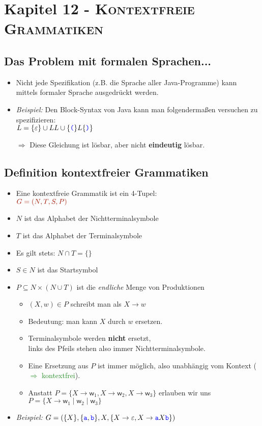 \documentclass{article}
\newcommand{\kapitel}[2]{Kapitel #1 - \textsc{#2}}
\newcommand{\blue}[1]{\textcolor{blue}{#1}}
\newcommand{\strongColor}[1]{\textcolor{strongColor}{#1}}
\newcommand{\strong}[1]{\textbf{\strongColor{#1}}}
\newcommand{\important}[1]{\textcolor{importantColor}{#1}}
\newcommand{\verweis}[1]{\textcolor{ForestGreen}{#1}}
\newcommand{\example}[1]{\textit{Beispiel: }#1}
\newcommand{\word}[1]{\blue{\texttt{#1}}}
\newcommand{\set}[1]{\{#1\}}
\newcommand{\w}{\textsf{w}}
\begin{document}
\newpage
\section{\kapitel{12}{Kontextfreie Grammatiken}}
\subsection{Das Problem mit formalen Sprachen...}
\begin{itemize}
    \item Nicht jede Spezifikation (z.B. die Sprache aller Java-Programme) kann mittels formaler Sprache ausgedrückt werden.
    \item \example{Den Block-Syntax von Java kann man folgendermaßen versuchen zu spezifizieren:\\$L=\set{\varepsilon}\cup LL\cup\set{\word{(}}L\set{\word{)}}$}
    \item[$\Rightarrow$]Diese Gleichung ist \important{lösbar}, aber nicht \important{\strong{eindeutig} lösbar}.
\end{itemize}

\subsection{Definition kontextfreier Grammatiken}
\begin{itemize}
    \item Eine kontextfreie Grammatik ist ein 4-Tupel:\\
    $\important{G=(N,T,S,P)}$
    \item \important{$N$} ist das Alphabet der \important{Nichtterminalsymbole}
    \item \important{$T$} ist das Alphabet der \important{Terminalsymbole}
    \item Es gilt stets: $N\cap T = \set{}$
    \item \important{$S \in N$} ist das \important{Startsymbol} 
    \item \important{$P \subseteq N \times (N\cup T)$} ist die \textit{endliche} Menge von \important{Produktionen}
    \begin{itemize}
        \item $(X, w) \in P$ schreibt man als $X \rightarrow w$
        \item Bedeutung: man kann $X$ durch $w$ ersetzen.
        \item Terminalsymbole werden \strong{nicht} ersetzt,\\links des Pfeils stehen also immer Nichtterminalsymbole.
        \item Eine Ersetzung aus $P$ ist immer möglich, also unabhängig vom Kontext (\verweis{$\Rightarrow$ kontextfrei}).
        \item Anstatt $P=\set{X\rightarrow\w_1, X\rightarrow\w_2,X\rightarrow\w_3}$ erlauben wir uns $P=\set{X\rightarrow\w_1\mid\w_2\mid\w_3}$
    \end{itemize}
    \item \example{$G=(\set{X}, \set{\word{a},\word{b}}, X, \set{X\rightarrow\varepsilon, X\rightarrow\word{a}X\word{b}})$}
\end{itemize}
\end{document}
